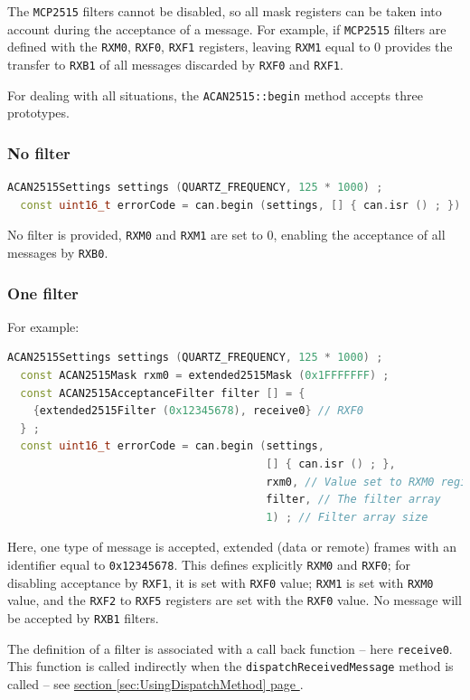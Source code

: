 \documentclass[9pt, a4paper, obeyspaces]{extarticle}
\newcommand\refSectionPage[1]{\hyperref[sec:#1]{section \ref*{sec:#1} page \pageref{sec:#1}}}
\newcommand \subsubsectionLabel[2]{\subsubsection{#1}\label{subsubsec:#2}}
\begin{document}
The \texttt{MCP2515} filters cannot be disabled, so all mask registers can be taken into account during the acceptance of a message. For example, if \texttt{MCP2515} filters are defined with the \texttt{RXM0}, \texttt{RXF0}, \texttt{RXF1} registers, leaving \texttt{RXM1} equal to $0$ provides the transfer to \texttt{RXB1} of all messages discarded by \texttt{RXF0} and \texttt{RXF1}.

For dealing with all situations, the \texttt{ACAN2515::begin} method accepts three prototypes.

\subsubsectionLabel{No filter}{noFilter}
{ \small\begin{lstlisting}[language=c++]
  ACAN2515Settings settings (QUARTZ_FREQUENCY, 125 * 1000) ;
  const uint16_t errorCode = can.begin (settings, [] { can.isr () ; }) ;
\end{lstlisting}}
No filter is provided, \texttt{RXM0} and \texttt{RXM1} are set to $0$, enabling the acceptance of all messages by \texttt{RXB0}.



\subsubsectionLabel{One filter}{oneFilter}

For example:
{ \small\begin{lstlisting}[language=c++]
  ACAN2515Settings settings (QUARTZ_FREQUENCY, 125 * 1000) ;
  const ACAN2515Mask rxm0 = extended2515Mask (0x1FFFFFFF) ;
  const ACAN2515AcceptanceFilter filter [] = {
    {extended2515Filter (0x12345678), receive0} // RXF0
  } ;
  const uint16_t errorCode = can.begin (settings,
                                        [] { can.isr () ; },
                                        rxm0, // Value set to RXM0 register
                                        filter, // The filter array
                                        1) ; // Filter array size
\end{lstlisting}}

Here, one type of message is accepted, extended (data or remote) frames with an identifier equal to \texttt{0x12345678}. This defines explicitly \texttt{RXM0} and \texttt{RXF0}; for disabling acceptance by \texttt{RXF1}, it is set with \texttt{RXF0} value; \texttt{RXM1} is set with \texttt{RXM0} value, and the \texttt{RXF2} to \texttt{RXF5} registers are set with the \texttt{RXF0} value. No message will be accepted by \texttt{RXB1} filters.

The definition of a filter is associated with a call back function -- here \texttt{receive0}. This function is called indirectly when the \texttt{dispatchReceivedMessage} method is called -- see \refSectionPage{UsingDispatchMethod}.
\end{document}
